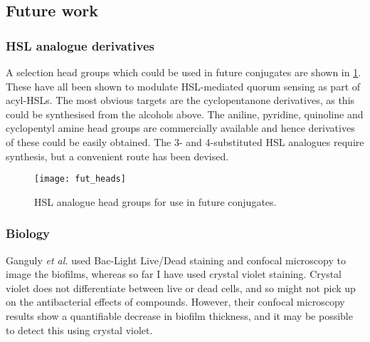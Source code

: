\subsection{Future work \label{sec:Fut2}}

\subsubsection{HSL analogue derivatives}


A selection head groups which could be used in future conjugates are shown in \ref{fgr:fut_heads}. These have all been shown to modulate HSL-mediated quorum sensing as part of acyl-HSLs\cite{Smith2003a,Welch2005,Ishida2007,Olsen2002,Smith2003,Hodgkinson2012a,Marsden2010}. The most obvious targets are the cyclopentanone derivatives, as this could be synthesised from the alcohols above. The aniline, pyridine, quinoline and cyclopentyl amine head groups are commercially available and hence derivatives of these could be easily obtained. The 3- and 4-substituted HSL analogues require synthesis, but a convenient route has been devised\cite{Olsen2002}.

\begin{figure}[H]
	\begin{center}
		\texttt{[image: fut\_heads]}
		\caption{HSL analogue head groups for use in future conjugates.
		\label{fgr:fut_heads}}
	\end{center}
\end{figure}

\subsubsection{Biology}


Ganguly \textit{et al.} used Bac-Light Live/Dead staining and confocal microscopy to image the biofilms, whereas so far I have used crystal violet staining. Crystal violet does not differentiate between live or dead cells, and so might not pick up on the antibacterial effects of compounds. However, their confocal microscopy results show a quantifiable decrease in biofilm thickness, and it may be possible to detect this using crystal violet.

